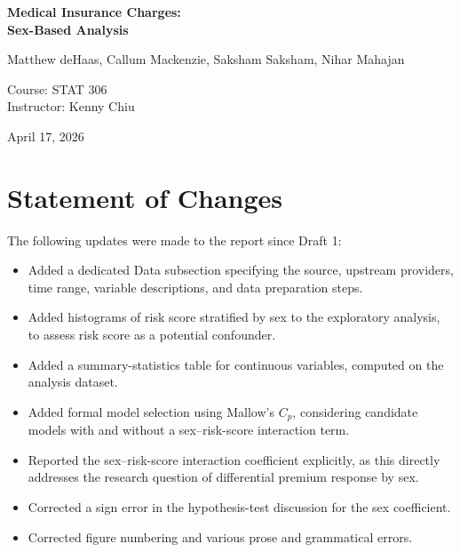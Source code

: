 \documentclass[12pt, a4paper]{article}
\begin{document}
 
\begin{titlepage}
  \centering
  \vspace*{2cm}
 
  {\LARGE\bfseries Medical Insurance Charges:\\[0.4em]
  Sex-Based Analysis}
 
  \vspace{1.5cm}
 
	{\large Matthew deHaas, Callum Mackenzie, Saksham Saksham, Nihar Mahajan}
 
  \vspace{1.5cm}
 
  {\normalsize {Course: STAT 306}}\\[0.4em]
  {\normalsize Instructor: Kenny Chiu}
 
  \vfill
 
  {\normalsize April 17, 2026}
 
  \vspace{1cm}
\end{titlepage}
 

\section*{Statement of Changes}
 
The following updates were made to the report since Draft 1:
\begin{itemize}
    \item Added a dedicated Data subsection specifying the source, upstream providers, time range, variable descriptions, and data preparation steps.
    \item Added histograms of risk score stratified by sex to the exploratory analysis, to assess risk score as a potential confounder.
    \item Added a summary-statistics table for continuous variables, computed on the analysis dataset.
    \item Added formal model selection using Mallow's $C_p$, considering candidate models with and without a sex--risk-score interaction term.
    \item Reported the sex--risk-score interaction coefficient explicitly, as this directly addresses the research question of differential premium response by sex.
    \item Corrected a sign error in the hypothesis-test discussion for the sex coefficient.
    \item Corrected figure numbering and various prose and grammatical errors.
   
\end{itemize}
\newpage
 
\end{document}

